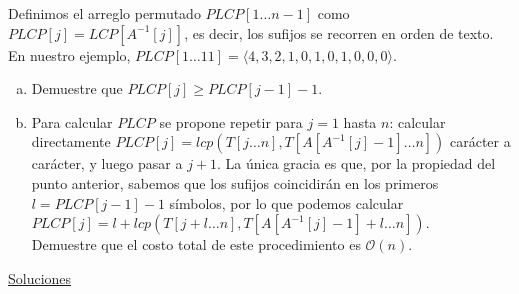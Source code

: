 \documentclass[dcc,uchile]{fcfmcourse}
\theoremstyle{plain}
\theoremstyle{definition}
\begin{document}
\begin{problems}
Definimos el arreglo permutado $PLCP[1\ldots n-1]$ como $PLCP[j] = LCP[A^{-1}[j]]$, es decir, los
sufijos se recorren en orden de texto. En nuestro ejemplo, $PLCP[1\ldots 11] = \langle 4, 3, 2, 1, 0, 1, 0, 1, 0, 0, 0\rangle$.
\begin{enumerate}[a)]
    \item Demuestre que $PLCP[j] \ge PLCP[j-1] - 1$.
    \item Para calcular $PLCP$ se propone repetir para $j = 1$ hasta $n$: calcular directamente $PLCP[j] = lcp(T[j\ldots n], T[A[A^{-1}[j]-1]\ldots n])$ carácter a carácter, y luego pasar a $j + 1$. La única gracia es que, por la propiedad del punto anterior, sabemos que los sufijos coincidirán en los primeros $l = PLCP[j-1]-1$ símbolos, por lo que podemos calcular $PLCP[j] = l + lcp(T[j + l\ldots n], T[A[A^{-1}[j]-1] + l\ldots n])$.\\
    Demuestre que el costo total de este procedimiento es $\mathcal{O}(n)$.
\end{enumerate}
\end{problems}
\newpage
\begin{center}
{\huge \underline{Soluciones}}
\end{center}
\end{document}

